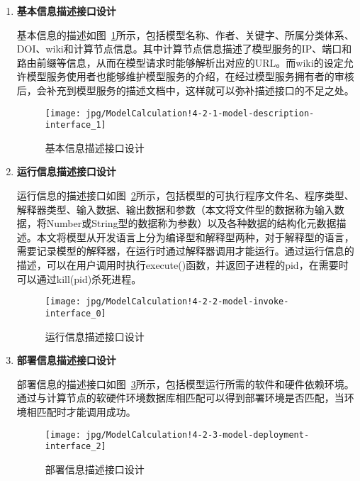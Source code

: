 \begin{enumerate}[(1)]
\item \textbf{基本信息描述接口设计}

基本信息的描述如图~\ref{fig:ModelCalculation!4-2-1-model-description-interface_1}所示，包括模型名称、作者、关键字、所属分类体系、DOI、wiki和计算节点信息。其中计算节点信息描述了模型服务的IP、端口和路由前缀等信息，从而在模型请求时能够解析出对应的URL。而wiki的设定允许模型服务使用者也能够维护模型服务的介绍，在经过模型服务拥有者的审核后，会补充到模型服务的描述文档中，这样就可以弥补描述接口的不足之处。

\begin{figure}[!htbp]
    \centering
    \texttt{[image: jpg/ModelCalculation!4-2-1-model-description-interface\_1]}
    \caption{基本信息描述接口设计}
    \label{fig:ModelCalculation!4-2-1-model-description-interface_1}
\end{figure}

\item \textbf{运行信息描述接口设计}
\label{sec:io-interface}

运行信息的描述接口如图~\ref{fig:ModelCalculation!4-2-2-model-invoke-interface_0}所示，包括模型的可执行程序文件名、程序类型、解释器类型、输入数据、输出数据和参数（本文将文件型的数据称为输入数据，将Number或String型的数据称为参数）以及各种数据的结构化元数据描述。本文将模型从开发语言上分为编译型和解释型两种，对于解释型的语言，需要记录模型的解释器，在运行时通过解释器调用才能运行。通过运行信息的描述，可以在用户调用时执行execute()函数，并返回子进程的pid，在需要时可以通过kill(pid)杀死进程。

\begin{figure}[!htbp]
    \centering
    \texttt{[image: jpg/ModelCalculation!4-2-2-model-invoke-interface\_0]}
    \caption{运行信息描述接口设计}
    \label{fig:ModelCalculation!4-2-2-model-invoke-interface_0}
\end{figure}

\item \textbf{部署信息描述接口设计}

部署信息的描述接口如图~\ref{fig:ModelCalculation!4-2-3-model-deployment-interface_2}所示，包括模型运行所需的软件和硬件依赖环境。通过与计算节点的软硬件环境数据库相匹配可以得到部署环境是否匹配，当环境相匹配时才能调用成功。

\begin{figure}[!htbp]
    \centering
    \texttt{[image: jpg/ModelCalculation!4-2-3-model-deployment-interface\_2]}
    \caption{部署信息描述接口设计}
    \label{fig:ModelCalculation!4-2-3-model-deployment-interface_2}
\end{figure}
\end{enumerate}

